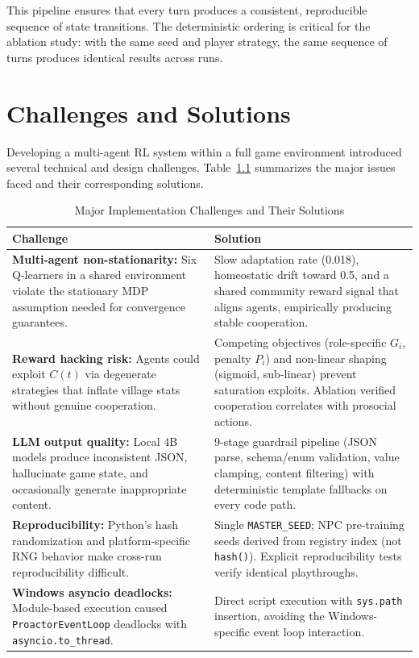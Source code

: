 \documentclass[12pt, a4paper, oneside]{report}
\begin{document}
This pipeline ensures that every turn produces a consistent, reproducible sequence of state transitions. The deterministic ordering is critical for the ablation study: with the same seed and player strategy, the same sequence of turns produces identical results across runs.

\chapter{Challenges and Solutions}
\label{chap:challenges}

Developing a multi-agent RL system within a full game environment introduced several technical and design challenges. Table~\ref{tab:challenges} summarizes the major issues faced and their corresponding solutions.

\begin{table}[H]
\centering
\caption{Major Implementation Challenges and Their Solutions}
\label{tab:challenges}
\begin{tabularx}{\textwidth}{|X|X|}
\hline
\textbf{Challenge} & \textbf{Solution} \\
\hline
\textbf{Multi-agent non-stationarity:} Six Q-learners in a shared environment violate the stationary MDP assumption needed for convergence guarantees.
& Slow adaptation rate (0.018), homeostatic drift toward 0.5, and a shared community reward signal that aligns agents, empirically producing stable cooperation. \\
\hline
\textbf{Reward hacking risk:} Agents could exploit $C(t)$ via degenerate strategies that inflate village stats without genuine cooperation.
& Competing objectives (role-specific $G_i$, penalty $P_i$) and non-linear shaping (sigmoid, sub-linear) prevent saturation exploits. Ablation verified cooperation correlates with prosocial actions. \\
\hline
\textbf{LLM output quality:} Local 4B models produce inconsistent JSON, hallucinate game state, and occasionally generate inappropriate content.
& 9-stage guardrail pipeline (JSON parse, schema/enum validation, value clamping, content filtering) with deterministic template fallbacks on every code path. \\
\hline
\textbf{Reproducibility:} Python's hash randomization and platform-specific RNG behavior make cross-run reproducibility difficult.
& Single \texttt{MASTER\_SEED}; NPC pre-training seeds derived from registry index (not \texttt{hash()}). Explicit reproducibility tests verify identical playthroughs. \\
\hline
\textbf{Windows asyncio deadlocks:} Module-based execution caused \texttt{ProactorEventLoop} deadlocks with \texttt{asyncio.to\_thread}.
& Direct script execution with \texttt{sys.path} insertion, avoiding the Windows-specific event loop interaction. \\
\hline
\end{tabularx}
\end{table}
\end{document}
